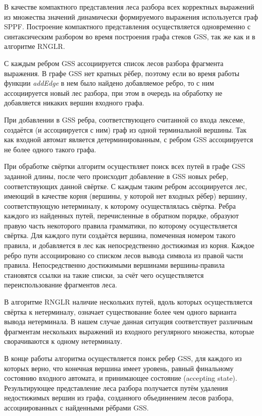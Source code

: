 В качестве компактного представления леса разбора всех корректных выражений из множества значений динамически формируемого выражения используется граф SPPF. Построение компактного представления осуществляется одновременно с синтаксическим разбором во время построения графа стеков GSS, так же как и в алгоритме RNGLR.

С каждым ребром GSS ассоциируется список лесов разбора фрагмента выражения. В графе GSS нет кратных рёбер, поэтому если во время работы функции \emph{addEdge} в нем было найдено добавляемое ребро, то с ним ассоциируется новый лес разбора, при этом в очередь на обработку не добавляется никаких вершин входного графа.  

При добавлении в GSS ребра, соответствующего считанной со входа лексеме, создаётся (и ассоциируется с ним) граф из одной терминальной вершины. Так как входной автомат является детерминированным, с ребром GSS ассоциируется не более одного такого графа.

При обработке свёртки алгоритм осуществляет поиск всех путей в графе GSS заданной длины, после чего происходит добавление в GSS новых ребер, соответствующих данной свёртке. С каждым таким ребром ассоциируется лес, имеющий в качестве корня (вершины, у которой нет входных рёбер) вершину, соответствующую нетерминалу, к которому осуществлялась свёртка. Ребра каждого из найденных путей, перечисленные в обратном порядке, образуют правую часть некоторого правила грамматики, по которому осуществляется свёртка. Для каждого пути создаётся вершина, помеченная номером такого правила, и добавляется в лес как непосредственно достижимая из корня. Каждое ребро пути ассоциировано со списком лесов вывода символа из правой части правила. Непосредственно достижимыми вершинами вершины-правила становятся ссылки на такие списки, за счёт чего осуществляется переиспользование фрагментов леса.

В алгоритме RNGLR наличие нескольких путей, вдоль которых осуществляется свёртка к нетерминалу, означает существование более чем одного варианта вывода нетерминала. В нашем случае данная ситуация соответствует различным фрагментам нескольких выражений из входного регулярного множества, которые сворачиваются к одному нетерминалу. 

В конце работы алгоритма осуществляется поиск ребер GSS, для каждого из которых верно, что конечная вершина имеет уровень, равный финальному состоянию входного автомата, и принимающее состояние (accepting state). Результирующее представление леса разбора получается путём удаления недостижимых вершин из графа, созданного объединением лесов разбора, ассоциированных с найденными рёбрами GSS.

